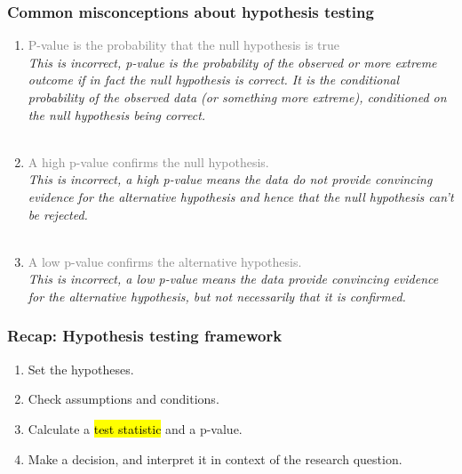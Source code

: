 \documentclass[11pt,containsverbatim,handout,xcolor=xelatex,dvipsnames,table]{beamer}
\begin{document}
\begin{frame}
\frametitle{Common misconceptions about hypothesis testing}

\begin{enumerate}

\item \textcolor{gray}{P-value is the probability that the null hypothesis is true} \\
\textit{This is incorrect, p-value is the probability of the observed or more extreme outcome if in fact the null hypothesis is correct. It is the conditional probability of the observed data (or something more extreme), conditioned on the null hypothesis being correct.} \\
$\:$ \\

\pause

\item  \textcolor{gray}{A high p-value confirms the null hypothesis.}\\
\textit{This is incorrect, a high p-value means the data do not provide convincing evidence for the alternative hypothesis and hence that the null hypothesis can't be rejected.} \\
$\:$ \\

\pause

\item   \textcolor{gray}{A low p-value confirms the alternative hypothesis.} \\
\textit{This is incorrect, a low p-value means the data provide convincing evidence for the alternative hypothesis, but not necessarily that it is confirmed.} \\

\end{enumerate}

\end{frame}


\begin{frame}
\frametitle{Recap: Hypothesis testing framework}

\begin{enumerate}

\item Set the hypotheses.

\item Check assumptions and conditions.

\item Calculate a \hl{test statistic} and a p-value.

\item Make a decision, and interpret it in context of the research question.

\end{enumerate}

\end{frame}
\end{document}
